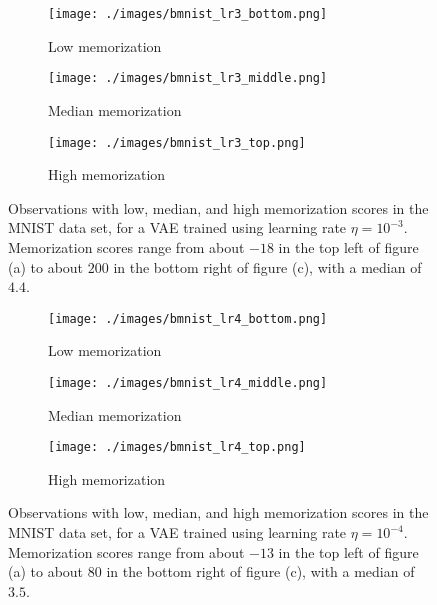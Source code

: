 \documentclass{article}
\begin{document}
\begin{figure}[h]
	\centering
	\captionsetup[subfigure]{justification=centering}%
	\begin{subfigure}[b]{.30\textwidth}
		\texttt{[image: ./images/bmnist\_lr3\_bottom.png]}
		\caption{Low memorization \label{fig:app_mnist_lr3_bottom}}
	\end{subfigure}
	\quad
	\begin{subfigure}[b]{.30\textwidth}
		\texttt{[image: ./images/bmnist\_lr3\_middle.png]}
		\caption{Median memorization \label{fig:app_mnist_lr3_middle}}
	\end{subfigure}
	\quad
	\begin{subfigure}[b]{.30\textwidth}
		\texttt{[image: ./images/bmnist\_lr3\_top.png]}
		\caption{High memorization \label{fig:app_mnist_lr3_top}}
	\end{subfigure}
	\caption{Observations with low, median, and high memorization scores 
		in the MNIST data set, for a VAE trained using learning rate 
		$\eta = 10^{-3}$. Memorization scores range from about $-18$ 
		in the top left of figure (a) to about $200$ in the bottom 
		right of figure (c), with a median of $4.4$.  
		\label{fig:app_mnist_lr3_mem}}
\end{figure}

\begin{figure}[h]
	\centering
	\captionsetup[subfigure]{justification=centering}%
	\begin{subfigure}[b]{.30\textwidth}
		\texttt{[image: ./images/bmnist\_lr4\_bottom.png]}
		\caption{Low memorization \label{fig:app_mnist_lr4_bottom}}
	\end{subfigure}
	\quad
	\begin{subfigure}[b]{.30\textwidth}
		\texttt{[image: ./images/bmnist\_lr4\_middle.png]}
		\caption{Median memorization \label{fig:app_mnist_lr4_middle}}
	\end{subfigure}
	\quad
	\begin{subfigure}[b]{.30\textwidth}
		\texttt{[image: ./images/bmnist\_lr4\_top.png]}
		\caption{High memorization \label{fig:app_mnist_lr4_top}}
	\end{subfigure}
	\caption{Observations with low, median, and high memorization scores 
		in the MNIST data set, for a VAE trained using learning rate 
		$\eta = 10^{-4}$. Memorization scores range from about $-13$ 
		in the top left of figure (a) to about $80$ in the bottom 
		right of figure (c), with a median of $3.5$.  
		\label{fig:app_mnist_lr4_mem}}
\end{figure}
\end{document}

